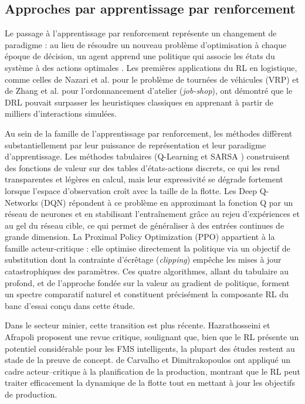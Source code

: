 \documentclass[11pt,a4paper]{article}
\begin{document}
\subsection{Approches par apprentissage par renforcement}

Le passage à l'apprentissage par renforcement représente un changement de paradigme : au lieu de résoudre un nouveau problème d'optimisation à chaque époque de décision, un agent apprend une politique qui associe les états du système à des actions optimales \cite{RichardSutton2018, MoezKrichen2022}. Les premières applications du RL en logistique, comme celles de Nazari et al. \cite{MohammadrezaNazari2018} pour le problème de tournées de véhicules (VRP) et de Zhang et al. \cite{CongZhang2020} pour l'ordonnancement d'atelier (\textit{job-shop}), ont démontré que le DRL pouvait surpasser les heuristiques classiques en apprenant à partir de milliers d'interactions simulées.

Au sein de la famille de l'apprentissage par renforcement, les méthodes diffèrent substantiellement par leur puissance de représentation et leur paradigme d'apprentissage. Les méthodes tabulaires (Q-Learning et SARSA \cite{RichardSutton2018}) construisent des fonctions de valeur sur des tables d'états-actions discrets, ce qui les rend transparentes et légères en calcul, mais leur expressivité se dégrade fortement lorsque l'espace d'observation croît avec la taille de la flotte. Les Deep Q-Networks (DQN) répondent à ce problème en approximant la fonction Q par un réseau de neurones et en stabilisant l'entraînement grâce au rejeu d'expériences et au gel du réseau cible, ce qui permet de généraliser à des entrées continues de grande dimension. La Proximal Policy Optimization (PPO) \cite{JohnSchulman2017} appartient à la famille acteur-critique : elle optimise directement la politique via un objectif de substitution dont la contrainte d'écrêtage (\textit{clipping}) empêche les mises à jour catastrophiques des paramètres. Ces quatre algorithmes, allant du tabulaire au profond, et de l'approche fondée sur la valeur au gradient de politique, forment un spectre comparatif naturel et constituent précisément la composante RL du banc d'essai conçu dans cette étude.

Dans le secteur minier, cette transition est plus récente. Hazrathosseini et Afrapoli \cite{Hazrathosseini2024} proposent une revue critique, soulignant que, bien que le RL présente un potentiel considérable pour les FMS intelligents, la plupart des études restent au stade de la preuve de concept. de Carvalho et Dimitrakopoulos \cite{deCarvalho2023} ont appliqué un cadre acteur--critique à la planification de la production, montrant que le RL peut traiter efficacement la dynamique de la flotte tout en mettant à jour les objectifs de production.
\end{document}
